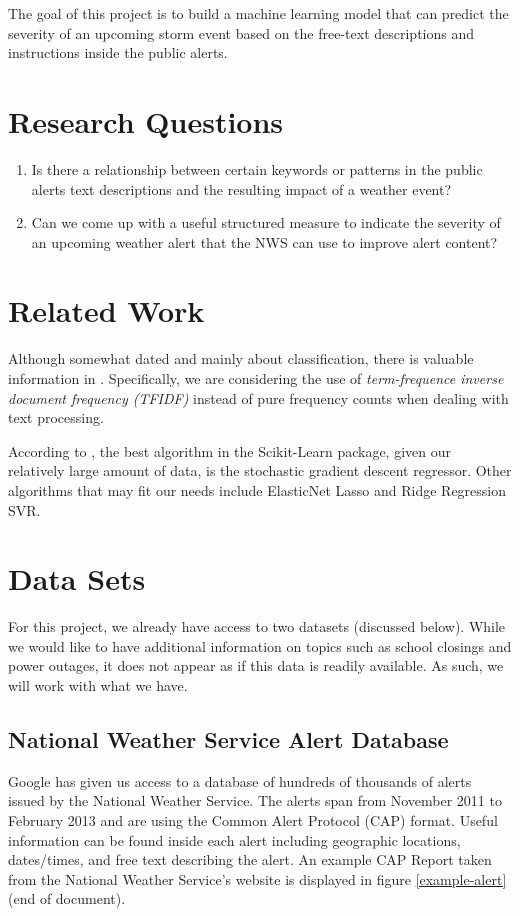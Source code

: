 \documentclass{article}
\begin{document}
The goal of this project is to build a machine learning model that can predict the severity of an upcoming storm event based on the free-text descriptions and instructions inside the public alerts. 

\section{Research Questions} 
\label{researchquestions}
\begin{enumerate}
\item
Is there a relationship between certain keywords or patterns in the public alerts text descriptions and the resulting impact of a weather event?
\item 
Can we come up with a useful structured measure to indicate the severity of an upcoming weather alert that the NWS can use to improve alert content?
\end{enumerate}
\section{Related Work}
\label{related}
Although somewhat dated and mainly about classification, there is valuable information in \cite{JoachimsNLP}. Specifically, we are considering the use of \textit{term-frequence inverse document frequency (TFIDF)} instead of pure frequency counts when dealing with text processing.

According to \cite{sklearn-flow}, the best algorithm in the Scikit-Learn package, given our relatively large amount of data, is the stochastic gradient descent regressor. Other algorithms that may fit our needs include ElasticNet Lasso and Ridge Regression SVR.

\section{Data Sets}
\label{datasets}

For this project, we already have access to two datasets (discussed below). While we would like to have additional information on topics such as school closings and power outages, it does not appear as if this data is readily available. As such, we will work with what we have.

\subsection{National Weather Service Alert Database}
Google has given us access to a database of hundreds of thousands of alerts issued by the National Weather Service. The alerts span from November 2011 to February 2013 and are using the Common Alert Protocol (CAP) format. Useful information can be found inside each alert including geographic locations, dates/times, and free text describing the alert. An example CAP Report taken from the National Weather Service's website is displayed in figure \ref{example-alert} (end of document).
\end{document}
